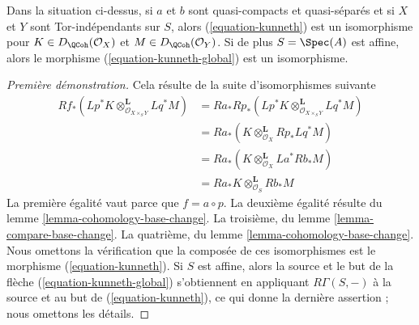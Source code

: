\begin{lemma}
\label{lemma-kunneth}
Dans la situation ci-dessus, si $a$ et $b$ sont quasi-compacts et quasi-séparés
et si $X$ et $Y$ sont Tor-indépendants sur $S$, alors (\ref{equation-kunneth})
est un isomorphisme pour $K \in D_\QCoh(\mathcal{O}_X)$ et
$M \in D_\QCoh(\mathcal{O}_Y)$. Si de plus $S = \Spec(A)$ est affine,
alors le morphisme (\ref{equation-kunneth-global}) est un isomorphisme.
\end{lemma}

\begin{proof}[Première démonstration]
Cela résulte de la suite d'isomorphismes suivante
\begin{align*}
Rf_*(Lp^*K \otimes_{\mathcal{O}_{X \times_S Y}}^\mathbf{L} Lq^*M)
& =
Ra_*Rp_*(Lp^*K \otimes_{\mathcal{O}_{X \times_S Y}}^\mathbf{L} Lq^*M) \\
& =
Ra_*(K \otimes_{\mathcal{O}_X}^\mathbf{L} Rp_*Lq^*M) \\
& =
Ra_*(K \otimes_{\mathcal{O}_X}^\mathbf{L} La^*Rb_*M) \\
& =
Ra_*K \otimes_{\mathcal{O}_S}^\mathbf{L} Rb_*M
\end{align*}
La première égalité vaut parce que $f = a \circ p$. La deuxième égalité
résulte du lemme \ref{lemma-cohomology-base-change}. La troisième, du
lemme \ref{lemma-compare-base-change}. La quatrième, du
lemme \ref{lemma-cohomology-base-change}.
Nous omettons la vérification que la composée de ces isomorphismes
est le morphisme (\ref{equation-kunneth}).
Si $S$ est affine, alors la source et le but de la flèche
(\ref{equation-kunneth-global}) s'obtiennent en appliquant
$R\Gamma(S, -)$ à la source et au but de (\ref{equation-kunneth}),
ce qui donne la dernière assertion ; nous omettons les détails.
\end{proof}

